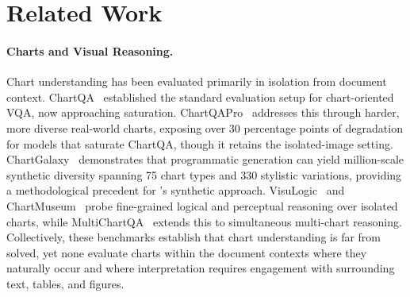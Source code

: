 \section{Related Work}
\label{sec:related}


\paragraph{Charts and Visual Reasoning.}
Chart understanding has been evaluated primarily in isolation from document context. ChartQA~\citep{masry2022chartqa} established the standard evaluation setup for chart-oriented VQA, now approaching saturation. ChartQAPro~\citep{masry2025chartqapro} addresses this through harder, more diverse real-world charts, exposing over 30 percentage points of degradation for models that saturate ChartQA, though it retains the isolated-image setting. ChartGalaxy~\citep{li2025chartgalaxy} demonstrates that programmatic generation can yield million-scale synthetic diversity spanning 75 chart types and 330 stylistic variations, providing a methodological precedent for \synthdocbench{}'s synthetic approach. VisuLogic~\citep{zhang2025visulogic} and ChartMuseum~\citep{xu2025chartmuseum} probe fine-grained logical and perceptual reasoning over isolated charts, while MultiChartQA~\citep{zhu2025multichartqa} extends this to simultaneous multi-chart reasoning. Collectively, these benchmarks establish that chart understanding is far from solved, yet none evaluate charts within the document contexts where they naturally occur and where interpretation requires engagement with surrounding text, tables, and figures.


